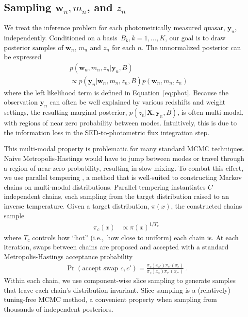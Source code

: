 \documentclass{article} %
\begin{document}
\subsection{Sampling $\mathbf{w}_n, m_n$, and $z_n$}
We treat the inference problem for each photometrically measured quasar, $\mathbf{y}_n$, independently.
Conditioned on a basis~${B_k, k=1,\dots, K}$, our goal is to draw posterior samples of $\mathbf{w}_n$, $m_n$ and $z_n$ for each $n$.  
The unnormalized posterior can be expressed
\begin{align}
  &p(\mathbf{w}_n, m_n, z_n | \mathbf{y}_n, B) \\
  &\propto p(\mathbf{y}_n | \mathbf{w}_n, m_n, z_n, B) p(\mathbf{w}_n, m_n, z_n) \end{align}
where the left likelihood term is defined in Equation~\ref{eq:phot}.
Because the observation $\mathbf{y}_n$ can often be well explained by various redshifts and weight settings, the resulting marginal posterior, $p(z_n | \mathbf{X}, \mathbf{y}_n, B)$, is often multi-modal, with regions of near zero probability between modes.
Intuitively, this is due to the information loss in the SED-to-photometric flux integration step.

This multi-modal property is problematic for many standard MCMC techniques. 
Naive Metropolis-Hastings would have to jump between modes or travel through a region of near-zero probability, resulting in slow mixing.  
To combat this effect, we use parallel tempering \cite{brooks2011handbook}, a method that is well-suited to constructing Markov chains on multi-modal distributions.
Parallel tempering instantiates $C$ independent chains, each sampling from the target distribution raised to an inverse temperature.
Given a target distribution, $\pi(x)$, the constructed chains sample 
\begin{align}
  \pi_c(x) &\propto \pi(x)^{1/T_c}
\end{align}
where $T_c$ controls how ``hot'' (i.e.,~how close to uniform) each chain is. 
At each iteration, swaps between chains are proposed and accepted with a standard Metropolis-Hastings acceptance probability 
\begin{align}
  \Pr(\text{accept swap } c, c') = \frac{ \pi_c(x_{c'}) \pi_{c'}(x_c) }{ \pi_c(x_c) \pi_{c'}(x_{c'}) } \, .
\end{align}
Within each chain, we use component-wise slice sampling \cite{neal2003slice} to generate samples that leave each chain's distribution invariant.  Slice-sampling is a (relatively) tuning-free MCMC method, a convenient property when sampling from thousands of independent posteriors.  
\end{document}
